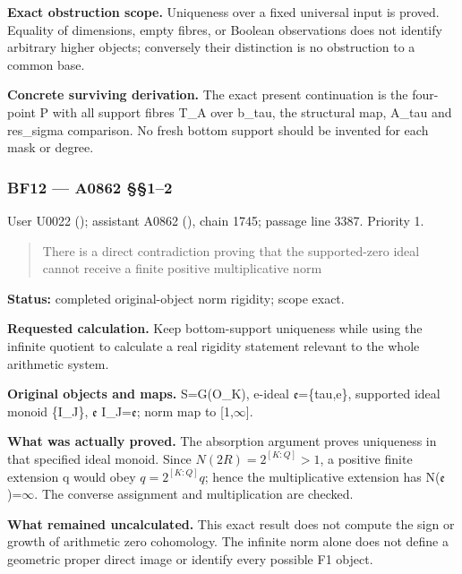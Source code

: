 \textbf{Exact obstruction scope.} Uniqueness over a fixed universal
input is proved. Equality of dimensions, empty fibres, or Boolean
observations does not identify arbitrary higher objects; conversely
their distinction is no obstruction to a common base.

\textbf{Concrete surviving derivation.} The exact present continuation
is the four-point P with all support fibres T\_A over b\_tau, the
structural map, A\_tau and res\_sigma comparison. No fresh bottom
support should be invented for each mask or degree.

\subsubsection{BF12 --- A0862 §§1--2}\label{TranscriptLedgerStage:bf12-a0862-12}

User U0022 (\protect{});
assistant A0862 (\protect{}),
chain 1745; passage line 3387. Priority 1.

\begin{quote}
There is a direct contradiction proving that the supported-zero ideal
cannot receive a finite positive multiplicative norm
\end{quote}

\textbf{Status:} completed original-object norm rigidity; scope exact.

\textbf{Requested calculation.} Keep bottom-support uniqueness while
using the infinite quotient to calculate a real rigidity statement
relevant to the whole arithmetic system.

\textbf{Original objects and maps.} S=G(O\_K), e-ideal
\allowbreak{}\ensuremath{𝔢}\allowbreak{}=\{tau,e\}, supported ideal
monoid \{I\_J\}, \allowbreak{}\ensuremath{𝔢}\allowbreak{}
I\_J=\allowbreak{}\ensuremath{𝔢}\allowbreak{}; norm map to
[1,\allowbreak{}\ensuremath{∞}\allowbreak{}].

\textbf{What was actually proved.} The absorption argument proves
uniqueness in that specified ideal monoid. Since
\(N(2R)=2^{[K:Q]}>1\), a positive finite extension q would
obey \(q=2^{[K:Q]}q\); hence the multiplicative extension has
N(\allowbreak{}\ensuremath{𝔢}\allowbreak{})=\allowbreak{}\ensuremath{∞}\allowbreak{}.
The converse assignment and multiplication are checked.

\textbf{What remained uncalculated.} This exact result does not compute
the sign or growth of arithmetic zero cohomology. The infinite norm
alone does not define a geometric proper direct image or identify every
possible F1 object.

